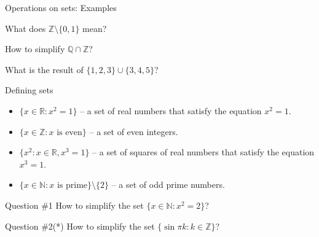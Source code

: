 \documentclass{beamer}
\begin{document}
    \begin{frame}{Operations on sets: Examples}
      \begin{example}
        What does $\mathbb{Z} \setminus \{0,1\}$ mean?
      \end{example}

      \begin{example}
        How to simplify $\mathbb{Q} \cap \mathbb{Z}$?
      \end{example}

      \begin{example}
        What is the result of $\{1,2,3\} \cup \{3,4,5\}$?
      \end{example}
    \end{frame}

    \begin{frame}{Defining sets}
      \begin{example}
        \begin{itemize}
          \item $\{x \in \mathbb{R}: x^2 = 1\}$ -- a set of real numbers that satisfy the equation $x^2 = 1$.
          \item $\{x \in \mathbb{Z}: x \text{ is even}\}$ -- a set of even integers.
          \item $\{x^2: x \in \mathbb{R}, x^3 = 1\}$ -- a set of squares of real numbers that satisfy the equation $x^3 = 1$.
          \item $\{x \in \mathbb{N}: x \text{ is prime}\} \setminus \{2\}$ -- a set of odd prime numbers.
        \end{itemize}
      \end{example}

      \begin{alertblock}{Question \#1}
        How to simplify the set $\{x \in \mathbb{N}: x^2 = 2\}$?
      \end{alertblock}
  
      \begin{alertblock}{Question \#2(*)}
        How to simplify the set $\{\sin \pi k: k \in \mathbb{Z}\}$?
      \end{alertblock}
    \end{frame}
\end{document}
